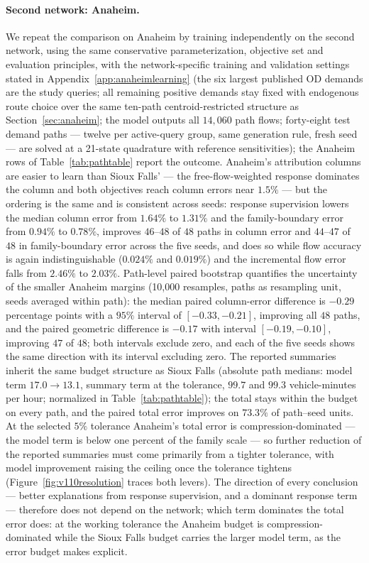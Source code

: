 \paragraph{Second network: Anaheim.}
We repeat the comparison on Anaheim by training independently on the
second network, using the same conservative parameterization,
objective set and evaluation principles, with the network-specific
training and validation settings stated in
Appendix~\ref{app:anaheimlearning} (the six largest published OD
demands are the study queries; all remaining positive demands stay
fixed with endogenous route choice over the same ten-path
centroid-restricted structure as Section~\ref{sec:anaheim}; the model
outputs all $14{,}060$ path flows; forty-eight test demand paths ---
twelve per active-query group, same generation rule, fresh seed ---
are solved at a 21-state quadrature with reference sensitivities);
the Anaheim rows of Table~\ref{tab:pathtable} report the outcome.
Anaheim's attribution columns are easier to learn than Sioux
Falls' --- the free-flow-weighted response dominates the column and
both objectives reach column errors near $1.5\%$ --- but the ordering
is the same and is consistent across seeds: response supervision
lowers the median column error from $1.64\%$ to $1.31\%$ and the
family-boundary error from $0.94\%$ to $0.78\%$, improves $46$--$48$
of $48$ paths in column error and $44$--$47$ of $48$ in
family-boundary error across the five seeds, and does so while flow
accuracy is again indistinguishable ($0.024\%$ and $0.019\%$) and the
incremental flow error falls from $2.46\%$ to $2.03\%$.
Path-level paired bootstrap quantifies the uncertainty of the smaller
Anaheim margins (10,000 resamples, paths as resampling unit, seeds
averaged within path): the median paired column-error difference is
$-0.29$ percentage points with a $95\%$ interval of $[-0.33,-0.21]$,
improving all $48$ paths, and the paired geometric difference is
$-0.17$ with interval $[-0.19,-0.10]$, improving $47$ of $48$; both
intervals exclude zero, and each of the five seeds shows the same
direction with its interval excluding zero. The
reported summaries inherit the same budget structure as Sioux Falls
(absolute path medians: model term $17.0\to13.1$, summary term at the
tolerance, $99.7$ and $99.3$ vehicle-minutes per hour; normalized in
Table~\ref{tab:pathtable}); the total stays within the budget on every
path, and the paired total error improves on $73.3\%$ of path--seed
units. At the selected $5\%$ tolerance Anaheim's total error is
compression-dominated --- the model term is below one percent of the
family scale --- so further reduction of the reported summaries must
come primarily from a tighter tolerance, with model improvement raising
the ceiling once the tolerance tightens (Figure~\ref{fig:v110resolution}
traces both levers). The direction of every conclusion --- better
explanations from response supervision, and a dominant response term
--- therefore does not depend on the network; which term dominates the
total error does: at the working tolerance the Anaheim budget is
compression-dominated while the Sioux Falls budget carries the larger
model term, as the error budget makes explicit.
